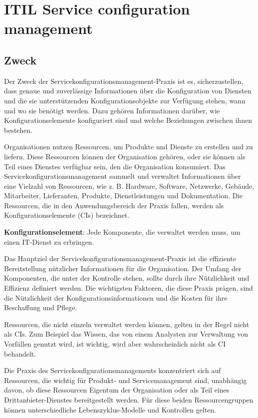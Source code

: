 \section{ITIL Service configuration management}

\subsection{Zweck}
Der Zweck der Servicekonfigurationsmanagement-Praxis ist es, sicherzustellen,
dass genaue und zuverlässige Informationen über die Konfiguration von
Diensten und die sie unterstützenden Konfigurationsobjekte zur Verfügung
stehen, wann und wo sie benötigt werden. Dazu gehören Informationen darüber,
wie Konfigurationselemente konfiguriert sind und welche
Beziehungen zwischen ihnen bestehen. 

Organisationen nutzen Ressourcen, um
Produkte und Dienste zu erstellen und zu liefern. Diese Ressourcen können der
Organisation gehören, oder sie können als Teil eines Dienstes verfügbar
sein, den die Organisation konsumiert. Das Servicekonfigurationsmanagement
sammelt und verwaltet Informationen über eine Vielzahl von Ressourcen, wie 
z. B. Hardware, Software, Netzwerke, Gebäude, Mitarbeiter, Lieferanten, Produkte,
Dienstleistungen und Dokumentation. Die Ressourcen, die in den
Anwendungsbereich der Praxis fallen, werden als Konfigurationselemente (CIs)
bezeichnet.

\begin{center}
	\textbf{Konfigurationselement}:
	Jede Komponente, die verwaltet werden muss, um einen IT-Dienst zu erbringen.
\end{center}

Das Hauptziel der Servicekonfigurationsmanagement-Praxis ist die effiziente
Bereitstellung nützlicher Informationen für die Organisation.
Der Umfang der Komponenten, die unter der Kontrolle stehen, sollte durch
ihre Nützlichkeit und Effizienz definiert werden. Die wichtigsten Faktoren,
die diese Praxis prägen, sind die Nützlichkeit der
Konfigurationsinformationen und die Kosten für ihre Beschaffung und Pflege.

Ressourcen, die nicht einzeln verwaltet werden können, gelten in der Regel
nicht als CIs. Zum Beispiel das Wissen, das von einem Analysten zur Verwaltung
von Vorfällen genutzt wird, ist wichtig, wird aber wahrscheinlich nicht als CI
behandelt. 

Die Praxis des
Servicekonfigurationsmanagements konzentriert sich auf Ressourcen, die wichtig
für Produkt- und Servicemanagement sind, unabhängig davon, ob
diese Ressourcen Eigentum der Organisation oder als Teil 
eines Drittanbieter-Dienstes bereitgestellt werden. Für
diese beiden Ressourcengruppen können unterschiedliche Lebenszyklus-Modelle und
Kontrollen gelten.

